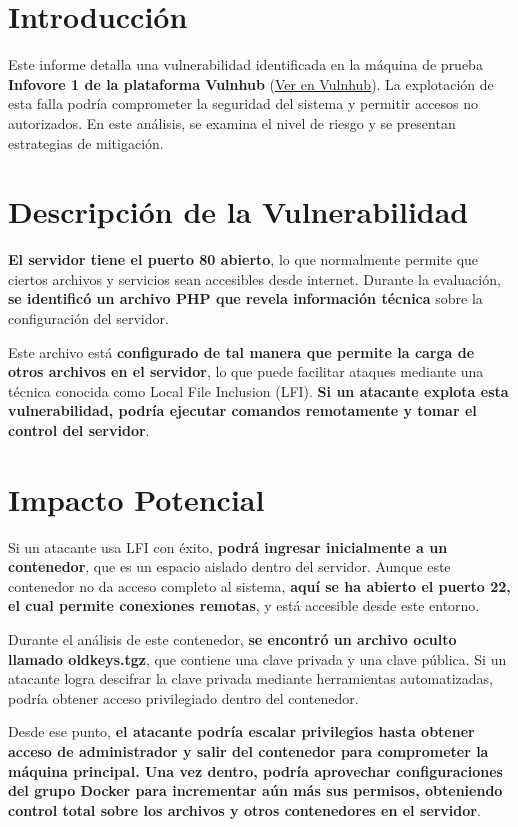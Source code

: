 \section{Introducción}

Este informe detalla una vulnerabilidad identificada en la máquina de prueba \textbf{Infovore 1 de la plataforma Vulnhub} (\href{https://www.vulnhub.com/entry/infovore-1,496/}{Ver en Vulnhub}). La explotación de esta falla podría comprometer la seguridad del sistema y permitir accesos no autorizados. En este análisis, se examina el nivel de riesgo y se presentan estrategias de mitigación.

\section{Descripción de la Vulnerabilidad}

\textbf{El servidor tiene el puerto 80 abierto}, lo que normalmente permite que ciertos archivos y servicios sean accesibles desde internet. Durante la evaluación, \textbf{se identificó un archivo PHP que revela información técnica} sobre la configuración del servidor.

Este archivo está \textbf{configurado de tal manera que permite la carga de otros archivos en el servidor}, lo que puede facilitar ataques mediante una técnica conocida como Local File Inclusion (LFI). \textbf{Si un atacante explota esta vulnerabilidad, podría ejecutar comandos remotamente y tomar el control del servidor}.

\section{Impacto Potencial}

Si un atacante usa LFI con éxito, \textbf{podrá ingresar inicialmente a un contenedor}, que es un espacio aislado dentro del servidor. Aunque este contenedor no da acceso completo al sistema, \textbf{aquí se ha abierto el puerto 22, el cual permite conexiones remotas}, y está accesible desde este entorno.

Durante el análisis de este contenedor, \textbf{se encontró un archivo oculto llamado oldkeys.tgz}, que contiene una clave privada y una clave pública. Si un atacante logra descifrar la clave privada mediante herramientas automatizadas, podría obtener acceso privilegiado dentro del contenedor.

Desde ese punto, \textbf{el atacante podría escalar privilegios hasta obtener acceso de administrador y salir del contenedor para comprometer la máquina principal. Una vez dentro, podría aprovechar configuraciones del grupo Docker para incrementar aún más sus permisos, obteniendo control total sobre los archivos y otros contenedores en el servidor}.


